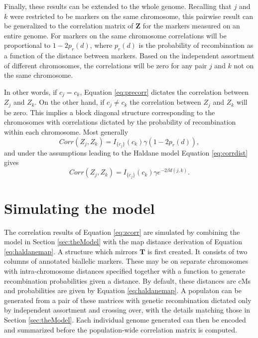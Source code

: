 \documentclass{article}
\newcommand{\ve}[1]{\mathbf{#1}}           %
\newcommand{\m}[1]{\mathbf{#1}}               %
\newcommand{\ind}[2]{I_{#2} \left( #1 \right)}
\begin{document}
Finally, these results can be extended to the whole genome. Recalling that $j$ and $k$ were restricted to be markers on the same chromosome, this pairwise result can be generalized to the correlation matrix of $\ve{Z}$ for the markers measured on an entire genome. For markers on the same chromosome correlations will be proportional to $1 - 2p_r(d)$, where $p_r(d)$ is the probability of recombination as a function of the distance between markers. Based on the independent assortment of different chromosomes, the correlations will be zero for any pair $j$ and $k$ not on the same chromosome.

In other words, if $c_j = c_k$, Equation \ref{eq:precorr} dictates the correlation between $Z_j$ and $Z_k$. On the other hand, if $c_j \neq c_k$ the correlation between $Z_j$ and $Z_k$ will be zero. This implies a block diagonal structure corresponding to the chromosomes with correlations dictated by the probability of recombination within each chromosome. Most generally
\begin{equation} \label{eq:zcorr_gen}
  Corr(Z_j, Z_k) = \ind{c_k}{\{c_j\}} \gamma (1 - 2p_r(d)),
\end{equation}
and under the assumptions leading to the Haldane model Equation \ref{eq:corrdist} gives
\begin{equation} \label{eq:zcorr}
  Corr(Z_j, Z_k) = \ind{c_k}{\{c_j\}} \gamma e^{-2 \beta d(j,k)}.
\end{equation}


\section{Simulating the model} \label{sec:sim}

The correlation results of Equation \ref{eq:zcorr} are simulated by combining the model in Section \ref{sec:theModel} with the map distance derivation of Equation \ref{eq:haldanemap}. A structure which mirrors $\m{T}$ is first created. It consists of two columns of annotated biallelic markers. These may be on separate chromosomes with intra-chromosome distances specified together with a function to generate recombination probabilities given a distance. By default, these distances are cMs and probabilities are given by Equation \ref{eq:haldanemap}. A populaton can be generated from a pair of these matrices with genetic recombination dictated only by independent assortment and crossing over, with the details matching those in Section \ref{sec:theModel}. Each individual genome generated can then be encoded and summarized before the population-wide correlation matrix is computed.
\end{document}
